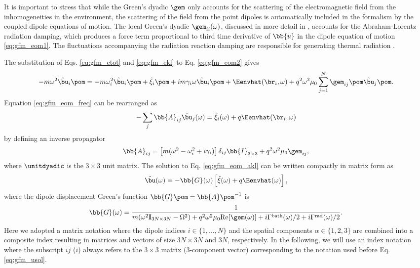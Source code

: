 It is important to stress that while the Green's dyadic $\gem$ only accounts for the scattering of the electromagnetic field from the inhomogeneities in the environment, the scattering of the field from the point dipoles is automatically included in the formalism by the coupled dipole equations of motion. The local Green's dyadic $\gem_{ii}(\omega)$, discussed in more detail in , accounts for the Abraham-Lorentz radiation damping, which produces a force term proportional to third time derivative of $\bb{u}$ in the dipole equation of motion \eqref{eq:gfm_eom1}. The fluctuations accompanying the radiation reaction damping are responsible for generating thermal radiation \cite{greffet10}.

The substitution of Eqs. \eqref{eq:gfm_etot} and \eqref{eq:gfm_ekl} to Eq. \eqref{eq:gfm_eom2} gives
\begin{equation}
 -m\omega^2 \hat{\bu}_i \pom =  -m\omega_i^2 \hat \bu_i\pom + \hat{\xi}_i\pom + im\gamma_i \omega \hat{\bu}_i\pom + \Eenvhat(\br_i,\omega) + q^2\omega^2\mu_0 \sum_{j=1}^N \gem_{ij}\pom \hat{\bu}_j\pom. \label{eq:gfm_eom_freq}
\end{equation}
Equation \eqref{eq:gfm_eom_freq} can be rearranged as
\begin{equation}
 - \sum_{j} \bb{A}_{ij} \hat{\bu}_j(\omega) = \hat{\xi}_i(\omega) + q\Eenvhat(\br_i,\omega) \label{eq:gfm_eom_akl}
\end{equation}
by defining an inverse propagator
\begin{equation}
 \bb{A}_{ij} = \left[m(\omega^2-\omega_i^2+i\gamma_i) \right]\delta_{ij}\bb{I}_{3\times 3}+ q^2\omega^2\mu_0 \gem_{ij},
\end{equation}
where $\unitdyadic$ is the $3\times 3$ unit matrix. The solution to Eq. \eqref{eq:gfm_eom_akl} can be written compactly in matrix form as
\begin{equation}
 \hat{\bu}(\omega) = -\bb{G}(\omega) \left[\hat{\xi}(\omega)+q\Eenvhat(\omega) \right], \label{eq:gfm_usol}
\end{equation}
where the dipole displacement Green's function $\bb{G}\pom=\bb{A}\pom^{-1}$ is
\begin{equation}
 \bb{G}(\omega) = \frac{1}{m(\omega^2 \mathbf{I}_{3N\times 3N}-\Omega^2)+q^2\omega^2\mu_0 \textrm{Re}[\gem(\omega)]+i\Gamma^{\textrm{bath}}(\omega)/2+i\Gamma^{\textrm{rad}}(\omega)/2}. \label{eq:gfm_g_expression1}
\end{equation}
Here we adopted a matrix notation where the dipole indices $i\in \{1,\dots,N\}$ and the spatial components $\alpha\in \{1,2,3\}$ are combined into a composite index resulting in matrices and vectors of size $3N\times 3N$ and $3N$, respectively. In the following, we will use an index notation where the subscript $ij$ ($i$) always refers to the $3\times 3$ matrix (3-component vector) corresponding to the notation used before Eq. \eqref{eq:gfm_usol}.

